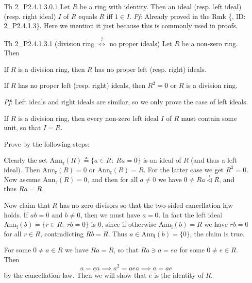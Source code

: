\documentclass{article}
\newcommand{\nles}{\vartriangleleft}
\newcommand{\ideal}{\overset{\text{r}}{\nles}} %
\begin{document}
\begin{Th}{Th 2\_P2.4.1.3.0.1}
    Let $R$ be a ring with identity. Then an ideal (resp. left ideal) (resp. right ideal) $I$ of $R$ equals $R$ iff $1\in I$.
    \tcblower
    \textit{Pf}: Already proved in the Rmk \{, ID: 2\_P2.4.1.3\}. Here we mention it just because this is commonly used in proofs.
\end{Th}

\begin{Th}{Th 2\_P2.4.1.3.1 (division ring $\overset{?}{\Longleftrightarrow}$ no proper ideals)}
    Let $R$ be a non-zero ring. Then
    \begin{compactenum}
        \item If $R$ is a division ring, then $R$ has no proper left (resp. right) ideals.
        \item If $R$ has no proper left (resp. right) ideals, then $R^2 = 0$ or $R$ is a division ring.
    \end{compactenum}
    \tcblower
    \textit{Pf}: Left ideals and right ideals are similar, so we only prove the case of left ideals. 
    \begin{compactenum}
        \item If $R$ is a division ring, then every non-zero left ideal $I$ of $R$ must contain some unit, so that $I = R$.
        \item Prove by the following steps:
        \begin{compactitem}
            \item Clearly the set $\text{Ann}_{\text{r}}(R) \triangleq \{a\in R:\; Ra = 0\}$ is an ideal of $R$ (and thus a left ideal). Then $\text{Ann}_{\text{r}}(R) = 0$ or $\text{Ann}_{\text{r}}(R) = R$. For the latter case we get $R^2 = 0$. Now assume $\text{Ann}_{\text{r}}(R) = 0$, and then for all $a\neq 0$ we have $0\neq Ra\ideal R$, and thus $Ra = R$. 
            \item Now claim that $R$ has no zero divisors so that the two-sided cancellation law holds. If $ab=0$ and $b\neq 0$, then we must have $a=0$. In fact the left ideal $\text{Ann}_{\text{l}}(b) = \{r\in R:\; rb = 0\}$ is $0$, since if otherwise $\text{Ann}_{\text{l}}(b) = R$ we have $rb=0$ for all $r\in R$, contradicting $Rb=R$. Thus $a\in\text{Ann}_{\text{l}}(b) = \{0\}$, the claim is true. 
            \item For some $0\neq a\in R$ we have $Ra = R$, so that $Ra\ni a = ea$ for some $0\neq e\in R$. Then $$ a = ea \implies a^2 = aea \implies a = ae $$
            by the cancellation law. Then we will show that $e$ is the identity of $R$. 

\end{compactitem}
\end{compactenum}
\end{Th}
\end{document}
